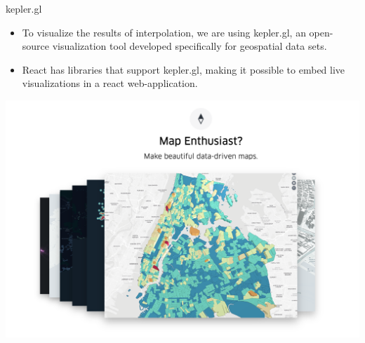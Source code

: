 \documentclass{beamer}
\begin{document}
\begin{frame}{kepler.gl}
\begin{itemize}
    \item To visualize the results of interpolation, we are using kepler.gl, an open-source visualization tool developed specifically for geospatial data sets. 
    \item React has libraries that support kepler.gl, making it possible to embed live visualizations in a react web-application.
\end{itemize}
\begin{center}
    \includegraphics[width=0.60\linewidth]{documentation/project_presentation/figures/Kepler.png} \\
\end{center}
\end{frame}
\end{document}
